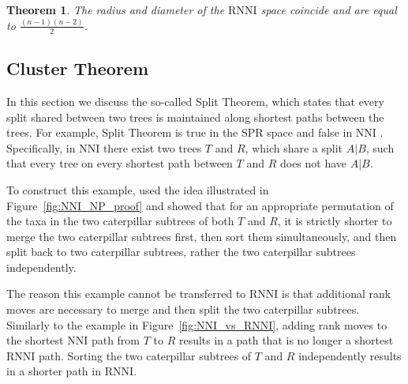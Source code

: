 \documentclass{amsart}
\newcommand{\nni}{\mathrm{NNI}}
\newcommand{\rnni}{\mathrm{RNNI}}
\newcommand{\spr}{\mathrm{SPR}}
\newtheorem{theorem}[definition]{Theorem}
\begin{document}
\begin{theorem}
The radius and diameter of the $\rnni$ space coincide and are equal to $\frac{(n-1)(n-2)}{2}$.
\label{thm:radius}
\end{theorem}


\subsection{Cluster Theorem}
\label{section:cluster_theorem}

In this section we discuss the so-called Split Theorem, which states that every split shared between two trees is maintained along shortest paths between the trees.
For example, Split Theorem is true in the $\spr$ space and false in $\nni$ \autocite{Li1996-zw}.
Specifically, in $\nni$ there exist two trees $T$ and $R$, which share a split $A | B$, such that every tree on every shortest path between $T$ and $R$ does not have $A | B$.

To construct this example, \textcite{Li1996-zw} used the idea illustrated in Figure~\ref{fig:NNI_NP_proof} and showed that for an appropriate permutation of the taxa in the two caterpillar subtrees of both $T$ and $R$, it is strictly shorter to merge the two caterpillar subtrees first, then sort them simultaneously, and then split back to two caterpillar subtrees, rather the two caterpillar subtrees independently.

The reason this example cannot be transferred to $\rnni$ is that additional rank moves are necessary to merge and then split the two caterpillar subtrees.
Similarly to the example in Figure~\ref{fig:NNI_vs_RNNI}, adding rank moves to the shortest $\nni$ path from $T$ to $R$ results in a path that is no longer a shortest $\rnni$ path.
Sorting the two caterpillar subtrees of $T$ and $R$ independently results in a shorter path in $\rnni$.
\end{document}
